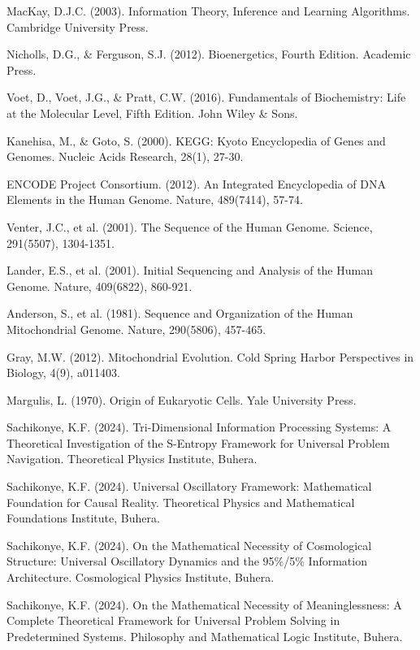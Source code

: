 \documentclass[12pt,a4paper]{article}
\begin{document}
\begin{thebibliography}{99}
MacKay, D.J.C. (2003). Information Theory, Inference and Learning Algorithms. Cambridge University Press.

Nicholls, D.G., \& Ferguson, S.J. (2012). Bioenergetics, Fourth Edition. Academic Press.

Voet, D., Voet, J.G., \& Pratt, C.W. (2016). Fundamentals of Biochemistry: Life at the Molecular Level, Fifth Edition. John Wiley \& Sons.

Kanehisa, M., \& Goto, S. (2000). KEGG: Kyoto Encyclopedia of Genes and Genomes. Nucleic Acids Research, 28(1), 27-30.

ENCODE Project Consortium. (2012). An Integrated Encyclopedia of DNA Elements in the Human Genome. Nature, 489(7414), 57-74.

Venter, J.C., et al. (2001). The Sequence of the Human Genome. Science, 291(5507), 1304-1351.

Lander, E.S., et al. (2001). Initial Sequencing and Analysis of the Human Genome. Nature, 409(6822), 860-921.

Anderson, S., et al. (1981). Sequence and Organization of the Human Mitochondrial Genome. Nature, 290(5806), 457-465.

Gray, M.W. (2012). Mitochondrial Evolution. Cold Spring Harbor Perspectives in Biology, 4(9), a011403.

Margulis, L. (1970). Origin of Eukaryotic Cells. Yale University Press.

Sachikonye, K.F. (2024). Tri-Dimensional Information Processing Systems: A Theoretical Investigation of the S-Entropy Framework for Universal Problem Navigation. Theoretical Physics Institute, Buhera.

Sachikonye, K.F. (2024). Universal Oscillatory Framework: Mathematical Foundation for Causal Reality. Theoretical Physics and Mathematical Foundations Institute, Buhera.

Sachikonye, K.F. (2024). On the Mathematical Necessity of Cosmological Structure: Universal Oscillatory Dynamics and the 95\%/5\% Information Architecture. Cosmological Physics Institute, Buhera.

Sachikonye, K.F. (2024). On the Mathematical Necessity of Meaninglessness: A Complete Theoretical Framework for Universal Problem Solving in Predetermined Systems. Philosophy and Mathematical Logic Institute, Buhera.

\end{thebibliography}
\end{document}

